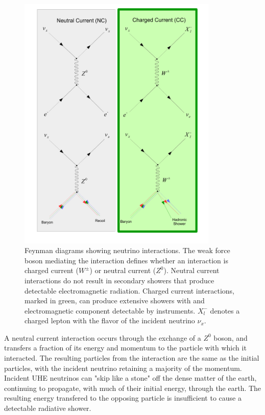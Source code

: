 \begin{figure}
	\centering
	\includegraphics[width=0.85\textwidth]{figures/NC_CC}
	\caption{Feynman diagrams showing neutrino interactions.  The weak force boson mediating the interaction defines whether an interaction is charged current ($W^{\pm}$) or neutral current ($Z^{0}$).  Neutral current interactions do not result in secondary showers that produce detectable electromagnetic radiation.  Charged current interactions, marked in green, can produce extensive showers with and electromagnetic component detectable by instruments.  $X^{-}_{l}$ denotes a charged lepton with the flavor of the incident neutrino $\nu_{x}$.}
	\label{fig:NC_CC}
\end{figure}

	
		A neutral current interaction occurs through the exchange of a $Z^{0}$ boson, and transfers a fraction of its energy and momentum to the particle with which it interacted.  The resulting particles from the interaction are the same as the initial particles, with the incident neutrino retaining a majority of the momentum.  Incident UHE neutrinos can "skip like a stone" off the dense matter of the earth, continuing to propagate, with much of their initial energy, through the earth.  The resulting energy transfered to the opposing particle is insufficient to cause a detectable radiative shower.
		

